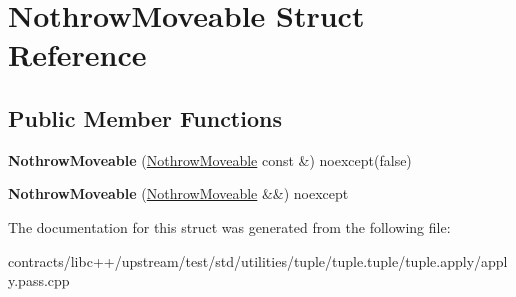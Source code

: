 \hypertarget{struct_nothrow_moveable}{}\section{Nothrow\+Moveable Struct Reference}
\label{struct_nothrow_moveable}
\subsection*{Public Member Functions}
\begin{DoxyCompactItemize}
\item 
\mbox{\label{struct_nothrow_moveable_a9d5b2f99b16695d9936907aea2679980}} 
{\bfseries Nothrow\+Moveable} (\mbox{\hyperlink{struct_nothrow_moveable}{Nothrow\+Moveable}} const \&) noexcept(false)
\item 
\mbox{\label{struct_nothrow_moveable_abdff03cac1b6f534c9d7f64fdfc7e301}} 
{\bfseries Nothrow\+Moveable} (\mbox{\hyperlink{struct_nothrow_moveable}{Nothrow\+Moveable}} \&\&) noexcept
\end{DoxyCompactItemize}


The documentation for this struct was generated from the following file\+:\begin{DoxyCompactItemize}
\item 
contracts/libc++/upstream/test/std/utilities/tuple/tuple.\+tuple/tuple.\+apply/apply.\+pass.\+cpp\end{DoxyCompactItemize}
